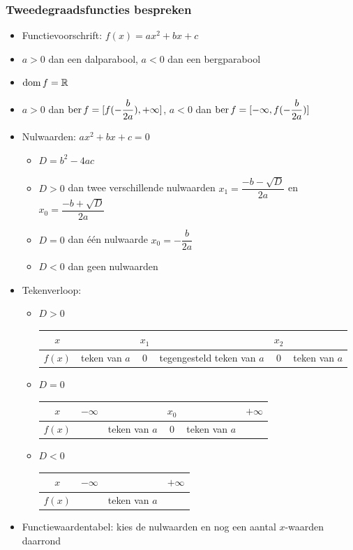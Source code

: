 \documentclass[12pt,twoside,a4paper]{article}
\begin{document}
\subsubsection*{Tweedegraadsfuncties bespreken}
\begin{mdframed}
  \begin{itemize}
  \item Functievoorschrift: $f(x)=ax^2 + bx + c$
  \item $a>0$ dan een dalparabool, $a<0$ dan een bergparabool
  \item $\dom f = \mathbb{R}$
  \item $a>0$ dan $\ber f = [f(-\dfrac{b}{2a}), +\infty]$, $a<0$ dan $\ber f = [-\infty, f(-\dfrac{b}{2a})]$
  \item Nulwaarden: $ax^2+bx+c=0$
    \renewcommand{\labelitemii}{$\bullet$}
    \begin{itemize}
    \item $D=b^2-4ac$
    \item $D>0$ dan twee verschillende nulwaarden $x_1=\dfrac{-b-\sqrt{D}}{2a}$ en $x_0=\dfrac{-b+\sqrt{D}}{2a}$
    \item $D=0$ dan één nulwaarde $x_0=-\dfrac{b}{2a}$
    \item $D<0$ dan geen nulwaarden
    \end{itemize}
  \item Tekenverloop:
    \begin{itemize}
    \item $D>0$
      \begin{tabular}{c|p{1.2cm}cp{2.2cm}cp{1.2cm}}
        $x$ & & $x_1$ & & $x_2$ &\\
        \hline
        $f(x)$ & teken van $a$ & 0 & tegengesteld teken van $a$ & 0 & teken van $a$
      \end{tabular}
    \item $D=0$
      \begin{tabular}{c|lp{1.5cm}cp{1.5cm}r}
        $x$ & $-\infty$ & & $x_0$ & & $+\infty$\\
        \hline
        $f(x)$ & & teken van $a$ & 0 & teken van $a$ &
      \end{tabular}
    \item $D<0$
      \begin{tabular}{c|lcr}
        $x$ & $-\infty$ &  & $+\infty$\\
        \hline
        $f(x)$ & & teken van $a$ &
      \end{tabular}
    \end{itemize}
  \item Functiewaardentabel: kies de nulwaarden en nog een aantal $x$-waarden daarrond

\end{itemize}
\end{mdframed}
\end{document}
